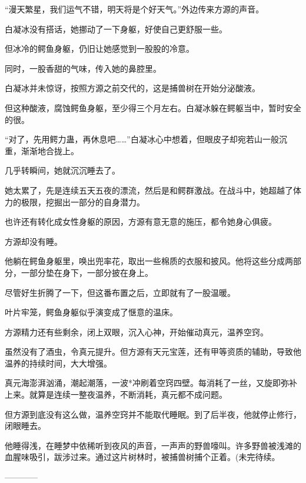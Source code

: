 \begin{this_body}
“漫天繁星，我们运气不错，明天将是个好天气。”外边传来方源的声音。

白凝冰没有搭话，她挪动了一下身躯，好使自己更舒服一些。

但冰冷的鳄鱼身躯，仍旧让她感觉到一股股的冷意。

同时，一股香甜的气味，传入她的鼻腔里。

白凝冰并未惊讶，按照方源之前交代的，这是捕兽树在开始分泌酸液。

但这种酸液，腐蚀鳄鱼身躯，至少得三个月左右。白凝冰躲在鳄躯当中，暂时安全的很。

“对了，先用鳄力蛊，再休息吧……”白凝冰心中想着，但眼皮子却宛若山一般沉重，渐渐地合拢上。

几乎转瞬间，她就沉沉睡去了。

她太累了，先是连续五天五夜的漂流，然后是和鳄群激战。在战斗中，她超越了体力的极限，挖掘出一部分的自身潜力。

也许还有转化成女性身躯的原因，方源有意无意的施压，都令她身心俱疲。

方源却没有睡。

他躺在鳄鱼身躯里，唤出兜率花，取出一些棉质的衣服和披风。他将这些分成两部分，一部分垫在身下，一部分披在身上。

尽管好生折腾了一下，但这番布置之后，立即就有了一股温暖。

叶片牢笼，鳄鱼身躯似乎演变成了惬意的温床。

方源精力还有些剩余，闭上双眼，沉入心神，开始催动真元，温养空窍。

虽然没有了酒虫，令真元提升。但方源有天元宝莲，还有甲等资质的辅助，导致他温养的持续时间，大大增强。

真元海澎湃汹涌，潮起潮落，一波*冲刷着空窍四壁。每消耗了一丝，又旋即弥补上来。就算是连续一整夜温养，不断消耗，真元都不成问题。

但方源到底没有这么做，温养空窍并不能取代睡眠。到了后半夜，他就停止修行，闭眼睡去。

他睡得浅，在睡梦中依稀听到夜风的声音，一声声的野兽嚎叫。许多野兽被浅滩的血腥味吸引，跋涉过来。通过这片树林时，被捕兽树捕个正着。(未完待续。

------------

\end{this_body}

